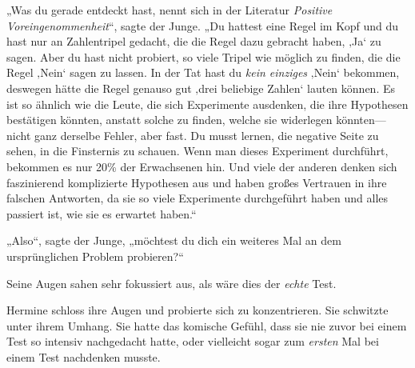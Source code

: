 „Was du gerade entdeckt hast, nennt sich in der Literatur \emph{Positive Voreingenommenheit}“, sagte der Junge. „Du hattest eine Regel im Kopf und du hast nur an Zahlentripel gedacht, die die Regel dazu gebracht haben, ‚Ja‘ zu sagen. Aber du hast nicht probiert, so viele Tripel wie möglich zu finden, die die Regel ‚Nein‘ sagen zu lassen. In der Tat hast du \emph{kein einziges} ‚Nein‘ bekommen, deswegen hätte die Regel genauso gut ‚drei beliebige Zahlen‘ lauten können. Es ist so ähnlich wie die Leute, die sich Experimente ausdenken, die ihre Hypothesen bestätigen könnten, anstatt solche zu finden, welche sie widerlegen könnten—nicht ganz derselbe Fehler, aber fast. Du musst lernen, die negative Seite zu sehen, in die Finsternis zu schauen. Wenn man dieses Experiment durchführt, bekommen es nur 20\% der Erwachsenen hin. Und viele der anderen denken sich faszinierend komplizierte Hypothesen aus und haben großes Vertrauen in ihre falschen Antworten, da sie so viele Experimente durchgeführt haben und alles passiert ist, wie sie es erwartet haben.“

„Also“, sagte der Junge, „möchtest du dich ein weiteres Mal an dem ursprünglichen Problem probieren?“

Seine Augen sahen sehr fokussiert aus, als wäre dies der \emph{echte} Test.

Hermine schloss ihre Augen und probierte sich zu konzentrieren. Sie schwitzte unter ihrem Umhang. Sie hatte das komische Gefühl, dass sie nie zuvor bei einem Test so intensiv nachgedacht hatte, oder vielleicht sogar zum \emph{ersten} Mal bei einem Test nachdenken musste.


